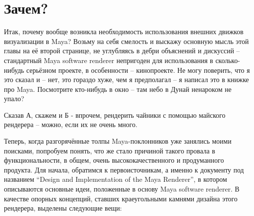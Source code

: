 \chapter*{Зачем?}
 

Итак, почему вообще возникла необходимость
   использования внешних движков визуализации в Maya? Возьму на
   себя смелость и выскажу основную мысль этой главы на её второй
   странице, не углубляясь в дебри объяснений и дискуссий –
   стандартный Maya software renderer непригоден для использования в сколько-нибудь серьёзном
   проекте, в особенности – кинопроекте. Не могу поверить, что я это
   сказал и – нет, это гораздо хуже, чем я предполагал – я написал это
   в книжке про Maya. Посмотрите
   кто-нибудь в окно – там небо в Дунай ненароком не упало?
 

Сказав А, скажем и Б - впрочем, рендерить чайники с
   помощью майского рендерера – можно, если их не очень
   много.
 

Теперь, когда разгорячённые толпы Maya-поклонников уже занялись моими поисками, попробуем понять,
   что же стало причиной такого провала в функциональности, в общем,
   очень высококачественного и продуманного продукта. Для начала,
   обратимся к первоисточникам, а именно к документу под названием “Design and Implementation of the Maya Renderer”, в котором
   описываются основные идеи, положенные в основу Maya software renderer. В
   качестве опорных концепций, ставших краеугольными камнями дизайна
   этого рендерера, выделены следующие вещи:
 


